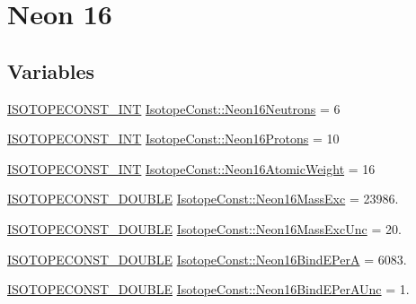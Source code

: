 \hypertarget{group___isotope_const-_neon-_ne16}{}\section{Neon 16}
\label{group___isotope_const-_neon-_ne16}
\subsection*{Variables}
\begin{DoxyCompactItemize}
\item 
\mbox{\hyperlink{group___isotope_const-_macros_ga5f18360b3e99483a35c32d789e62621c}{I\+S\+O\+T\+O\+P\+E\+C\+O\+N\+S\+T\+\_\+\+I\+NT}} \mbox{\hyperlink{group___isotope_const-_neon-_ne16_gaf46b3aa8412eb8a56d8eb8cb25d52c4c}{Isotope\+Const\+::\+Neon16\+Neutrons}} = 6
\item 
\mbox{\hyperlink{group___isotope_const-_macros_ga5f18360b3e99483a35c32d789e62621c}{I\+S\+O\+T\+O\+P\+E\+C\+O\+N\+S\+T\+\_\+\+I\+NT}} \mbox{\hyperlink{group___isotope_const-_neon-_ne16_ga93c9be27f12462e6d48768bd76e62c75}{Isotope\+Const\+::\+Neon16\+Protons}} = 10
\item 
\mbox{\hyperlink{group___isotope_const-_macros_ga5f18360b3e99483a35c32d789e62621c}{I\+S\+O\+T\+O\+P\+E\+C\+O\+N\+S\+T\+\_\+\+I\+NT}} \mbox{\hyperlink{group___isotope_const-_neon-_ne16_gad0fce6a459818aac661bdc1f51863665}{Isotope\+Const\+::\+Neon16\+Atomic\+Weight}} = 16
\item 
\mbox{\hyperlink{group___isotope_const-_macros_ga8f45a7272ce02c0b4c65c44636ed719a}{I\+S\+O\+T\+O\+P\+E\+C\+O\+N\+S\+T\+\_\+\+D\+O\+U\+B\+LE}} \mbox{\hyperlink{group___isotope_const-_neon-_ne16_gaf8bf74eee2c31eedbbbeab10eb8e6927}{Isotope\+Const\+::\+Neon16\+Mass\+Exc}} = 23986.
\item 
\mbox{\hyperlink{group___isotope_const-_macros_ga8f45a7272ce02c0b4c65c44636ed719a}{I\+S\+O\+T\+O\+P\+E\+C\+O\+N\+S\+T\+\_\+\+D\+O\+U\+B\+LE}} \mbox{\hyperlink{group___isotope_const-_neon-_ne16_ga2b070c5d8557ece761c4e990e02cb424}{Isotope\+Const\+::\+Neon16\+Mass\+Exc\+Unc}} = 20.
\item 
\mbox{\hyperlink{group___isotope_const-_macros_ga8f45a7272ce02c0b4c65c44636ed719a}{I\+S\+O\+T\+O\+P\+E\+C\+O\+N\+S\+T\+\_\+\+D\+O\+U\+B\+LE}} \mbox{\hyperlink{group___isotope_const-_neon-_ne16_ga017ccd9a6d93ad7497bc5c9da6c84f32}{Isotope\+Const\+::\+Neon16\+Bind\+E\+PerA}} = 6083.
\item 
\mbox{\hyperlink{group___isotope_const-_macros_ga8f45a7272ce02c0b4c65c44636ed719a}{I\+S\+O\+T\+O\+P\+E\+C\+O\+N\+S\+T\+\_\+\+D\+O\+U\+B\+LE}} \mbox{\hyperlink{group___isotope_const-_neon-_ne16_ga067cfcfb6d5772896b6d82354438a9aa}{Isotope\+Const\+::\+Neon16\+Bind\+E\+Per\+A\+Unc}} = 1.

\end{DoxyCompactItemize}
